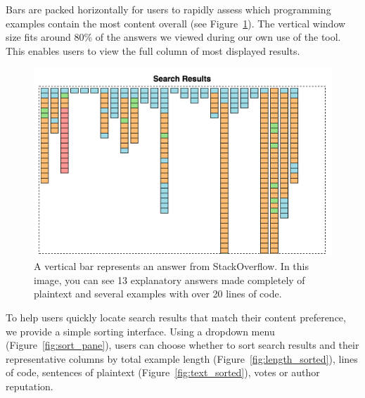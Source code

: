 Bars are packed horizontally for users to rapidly assess which programming examples contain the most content overall (see Figure~\ref{fig:bar_length}).
The vertical window size fits around 80\% of the answers we viewed during our own use of the tool. This enables users to view the full column of most displayed results.

\begin{figure}
 \centering
 \includegraphics[width=.9\columnwidth]{figures/bars_unaltered}
 \caption{A vertical bar represents an answer from StackOverflow.  
 In this image, you can see 13 explanatory answers made completely of plaintext and several examples with over 20 lines of code.}
 \label{fig:bar_length}
\end{figure}

To help users quickly locate search results that match their content preference, we provide a simple sorting interface.
Using a dropdown menu (Figure~\ref{fig:sort_pane}), users can choose whether to sort search results and their representative columns by total example length (Figure~\ref{fig:length_sorted}), lines of code, sentences of plaintext (Figure~\ref{fig:text_sorted}), votes or author reputation.

